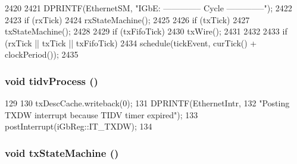 \begin{DoxyCode}
2420 {
2421     DPRINTF(EthernetSM, "IGbE: -------------- Cycle --------------\n");
2422 
2423     if (rxTick)
2424         rxStateMachine();
2425 
2426     if (txTick)
2427         txStateMachine();
2428 
2429     if (txFifoTick)
2430         txWire();
2431 
2432 
2433     if (rxTick || txTick || txFifoTick)
2434         schedule(tickEvent, curTick() + clockPeriod());
2435 }
\end{DoxyCode}
\hypertarget{classIGbE_aedc70a3ef5f173813e3060f77fa53bc8}{
\subsubsection[{tidvProcess}]{\setlength{\rightskip}{0pt plus 5cm}void tidvProcess ()}}
\label{classIGbE_aedc70a3ef5f173813e3060f77fa53bc8}



\begin{DoxyCode}
129                        {
130         txDescCache.writeback(0);
131         DPRINTF(EthernetIntr,
132                 "Posting TXDW interrupt because TIDV timer expired\n");
133         postInterrupt(iGbReg::IT_TXDW);
134     }
\end{DoxyCode}
\hypertarget{classIGbE_a86f1c8a72188e638c991535ba96f5f0e}{
\subsubsection[{txStateMachine}]{\setlength{\rightskip}{0pt plus 5cm}void txStateMachine ()}}
\label{classIGbE_a86f1c8a72188e638c991535ba96f5f0e}



